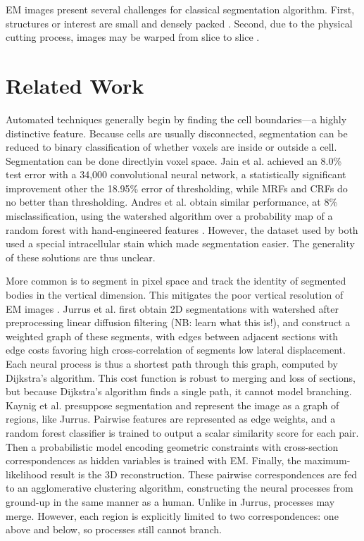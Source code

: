 \documentclass[english]{article}
\newcommand{\+}[1]{\ensuremath{\boldsymbol{\mathrm{#1}}}}
\begin{document}
EM images present several challenges for classical segmentation algorithm. First, structures or interest are small and densely packed \cite{Jain2007}. Second, due to the physical cutting process, images may be warped from slice to slice \cite{Koshevoy2006}.

\section{Related Work}
Automated techniques generally begin by finding the cell boundaries---a highly distinctive feature. Because cells are usually disconnected, segmentation can be reduced to binary classification of whether voxels are inside or outside a cell. Segmentation can be done directlyin voxel space. Jain et al. \cite{Jain2007} achieved an 8.0\% test error with a 34,000 convolutional neural network, a statistically significant improvement other the 18.95\% error of thresholding, while MRFs and CRFs do no better than thresholding. Andres et al. obtain similar performance, at 8\% misclassification, using the watershed algorithm over a probability map of a random forest with hand-engineered features \cite{Andres2008}. However, the dataset used by both used a special intracellular stain which made segmentation easier. The generality of these solutions are thus unclear.

More common is to segment in pixel space and track the identity of segmented bodies in the vertical dimension. This mitigates the poor vertical resolution of EM images \cite{Kaynig2010, Briggman2006}. Jurrus et al. \cite{Jurrus2008} first obtain 2D segmentations with watershed after preprocessing linear diffusion filtering (NB: learn what this is!), and construct a weighted graph of these segments, with edges between adjacent sections with edge costs favoring high cross-correlation of segments low lateral displacement. Each neural process is thus a shortest path through this graph, computed by Dijkstra's algorithm. This cost function is robust to merging and loss of sections, but because Dijkstra's algorithm finds a single path, it cannot model branching. Kaynig et al. \cite{Kaynig2010a} presuppose segmentation and represent the image as a graph of regions, like Jurrus. Pairwise features are represented as edge weights, and a random forest classifier is trained to output a scalar similarity score for each pair. Then a probabilistic model encoding geometric constraints with cross-section correspondences as hidden variables is trained with EM. Finally, the maximum-likelihood result is the 3D reconstruction. These pairwise correspondences are fed to an agglomerative clustering algorithm, constructing the neural processes from ground-up in the same manner as a human. Unlike in Jurrus, processes may merge. However, each region is explicitly limited to two correspondences: one above and below, so processes still cannot branch.
\end{document}
